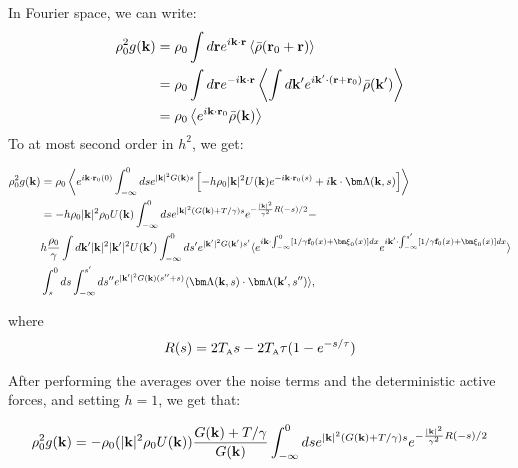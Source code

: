 \documentclass[superscriptaddress, twocolumn, prl, longbibliography, nofootinbib]{revtex4-1}
\newcommand{\A}{\text{\tiny{A}}}
\begin{document}
In Fourier space, we can write:
\begin{align*}
\rho^2_0 g({\bf k}) & = \rho_0 \int d{\bf r} e^{i{\bf k} \cdot{\bf r}} \left \langle   \bar \rho( {\bf r}_0 + {\bf r} ) \right \rangle \\ 
& = \rho_0 \int d{\bf r} e^{-i{\bf k} \cdot{\bf r}} \left \langle   \int d{\bf k}' e^{i{\bf k}' \cdot( {\bf r} +  {\bf r}_0) } \bar{\rho}({\bf k}') \right \rangle \\ 
& =  \rho_0 \left \langle  e^{i{\bf k} \cdot {\bf r}_0 } \bar{\rho}({\bf k}) \right \rangle
\end{align*}
To at most second order in $h^2$, we get:
\begin{widetext}
\begin{align*}
\rho^2_0 g({\bf k}) & =  \rho_0 \left \langle e^{i{\bf k} \cdot {\bf r}_0(0) }  \int_{-\infty}^0 ds e^{|{\bf k}|^2 G({\bf k})s}  \left[ -h \rho_0 |{\bf k}|^2 U({\bf k}) e^{-i{\bf k} \cdot {\bf r}_0(s)} + i{\bf k}\cdot  {\bm \Lambda}({\bf k}, s) \right] \right \rangle \\
& = - h \rho_0 |{\bf k}|^2 \rho_0  U({\bf k}) \int
_{-\infty}^0 ds e^{|{\bf k}|^2 ( G({\bf k}) + T/ \gamma)s}  e^{-\frac{|{\bf k}|^2}{\gamma^2} R(-s)/2} - \\
&  h \dfrac{\rho_0}{\gamma}  \int d{\bf k}'  |{\bf k}|^2 |{\bf k}'|^2 U({\bf k}') \int_{-\infty}^0 ds' e^{ |{\bf k}'|^2 G({\bf k}') s'}  \langle e^{i{\bf k}\cdot \int_{-\infty}^0 [1/\gamma {\bf f}_0(x) + {\bm \xi}_0(x) ]dx}  e^{i{\bf k}'\cdot \int_{-\infty}^{s'} [1/\gamma {\bf f}_0(x) + {\bm \xi}_0(x)] dx}    \rangle \\
& \int_{s}^{0} ds  \int_{-\infty}^{s'} ds'' e^{ |{\bf k}'|^2 G({\bf k}) (s''+s)}  \langle {\bm \Lambda}({\bf k}, s) \cdot {\bm \Lambda}({\bf k}', s'')\rangle,
\end{align*}
\end{widetext}

where 
\begin{equation*}
R(s) = 2T_\A s - 2 T_\A \tau (1 - e^{-s/\tau}) 
\end{equation*}

After performing the averages over the noise terms and the deterministic active forces, and setting $h=1$, we get that:
\begin{widetext}
\begin{align}
\rho^2_0 g({\bf k}) = - \rho_0 ( |{\bf k}|^2 \rho_0 U({\bf k}))  \dfrac{ G({\bf k}) + T/ \gamma}{G({\bf k})} \int
_{-\infty}^0 ds e^{|{\bf k}|^2 ( G({\bf k}) + T/ \gamma)s}  e^{-\frac{|{\bf k}|^2}{\gamma^2} R(-s)/2}
\end{align}
\end{widetext}
\end{document}
